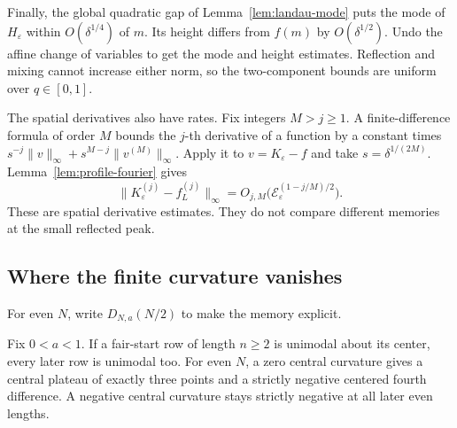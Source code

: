 Finally, the global quadratic gap of Lemma~\ref{lem:landau-mode}
puts the mode of $H_\varepsilon$ within $O(\delta^{1/4})$ of $m$.
Its height differs from $f(m)$ by $O(\delta^{1/2})$.
Undo the affine change of variables to get the mode and height
estimates. Reflection and mixing cannot increase either norm, so
the two-component bounds are uniform over $q\in[0,1]$.

The spatial derivatives also have rates. Fix integers $M>j\ge1$.
A finite-difference formula of order $M$ bounds the $j$-th derivative
of a function by a constant times
$s^{-j}\|v\|_\infty+s^{M-j}\|v^{(M)}\|_\infty$.
Apply it to $v=K_\varepsilon-f$ and take
$s=\delta^{1/(2M)}$. Lemma~\ref{lem:profile-fourier} gives
\begin{equation}\label{eq:profile-derivative-rate}
 \|K_\varepsilon^{(j)}-f_L^{(j)}\|_\infty
 =O_{j,M}\bigl(\mathcal E_\varepsilon^{(1-j/M)/2}\bigr).
\end{equation}
These are spatial derivative estimates. They do not compare different
memories at the small reflected peak.

\subsection{Where the finite curvature vanishes}
\label{app:finite-threshold}

For even $N$, write $D_{N,a}(N/2)$ to make the memory explicit.

\begin{lemma}\label{lem:finite-shape-persistence}
Fix $0<a<1$. If a fair-start row of length $n\ge2$ is unimodal
about its center, every later row is unimodal too.
For even $N$, a zero central curvature gives a central plateau
of exactly three points and a strictly negative centered fourth difference.
A negative central curvature stays strictly negative at all later even lengths.
\end{lemma}

